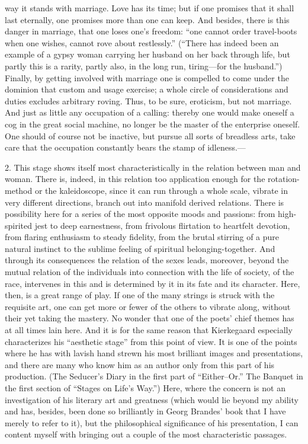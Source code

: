 \documentclass[12pt,a4paper]{book}
\newcommand{\opage}[1]{\marginnote{\footnotesize\textit{[#1]}}}
\begin{document}
way
\opage{85}it stands with marriage. Love has its time; but if one promises
that it shall last eternally, one promises more than one can keep. And
besides, there is this danger in marriage, that one loses one's freedom:
``one cannot order travel-boots when one wishes, cannot rove about
restlessly.'' (``There has indeed been an example of a gypsy woman
carrying her husband on her back through life, but partly this is a
rarity, partly also, in the long run, tiring---for the husband.'')
Finally, by getting involved with marriage one is compelled to come under
the dominion that custom and usage exercise; a whole circle of
considerations and duties excludes arbitrary roving. Thus, to be sure,
eroticism, but not marriage. And just as little any occupation of a
calling: thereby one would make oneself a cog in the great social machine,
no longer be the master of the enterprise oneself. One should of course
not be inactive, but pursue all sorts of breadless arts, take care that
the occupation constantly bears the stamp of idleness.---

2. This stage shows itself most characteristically in the relation
between man and woman. There is, indeed, in this relation too application
enough for the rotation-method or the kaleidoscope, since it can run
through a whole scale, vibrate in very different directions, branch out
into manifold derived relations. There is possibility here for a series of
the most opposite moods and passions: from high-spirited jest to deep
earnestness, from frivolous flirtation to heartfelt devotion, from flaring
enthusiasm to steady fidelity, from the brutal stirring of a pure natural
instinct to the sublime feeling of spiritual belonging-together. And
through its consequences the relation of the sexes leads, moreover, beyond
the mutual relation of the individuals into connection with the life of
society, of the race, intervenes in this and is determined by it in its
fate and its character.
\opage{86}Here, then, is a great range of play. If one of the many strings
is struck with the requisite art, one can get more or fewer of the others
to vibrate along, without their yet taking the mastery. No wonder that one
of the poets' chief themes has at all times lain here. And it is for the
same reason that Kierkegaard especially characterizes his ``aesthetic
stage'' from this point of view. It is one of the points where he has with
lavish hand strewn his most brilliant images and presentations, and there
are many who know him as an author only from this part of his production.
(The Seducer's Diary in the first part of ``Either--Or.'' The Banquet in
the first section of ``Stages on Life's Way.'') Here, where the concern is
not an investigation of his literary art and greatness (which would lie
beyond my ability and has, besides, been done so brilliantly in Georg
Brandes' book that I have merely to refer to it), but the philosophical
significance of his presentation, I can content myself with bringing out a
couple of the most characteristic passages.
\end{document}
